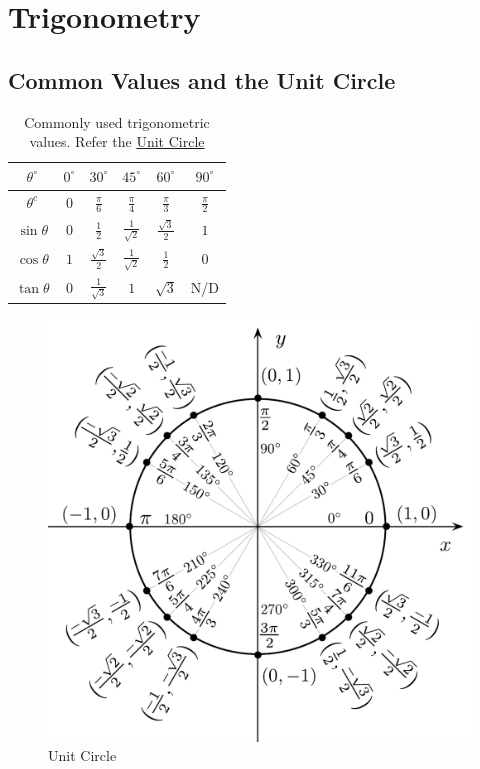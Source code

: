 \section{Trigonometry}
\subsection{Common Values and the Unit Circle}
\begin{table}[H]
	\centering
	\renewcommand{\arraystretch}{1.5}
	\begin{tabular}{cccccc}
		\toprule
		$\theta ^ \circ$ & $0^ \circ$ & $30^ \circ$ & $45^ \circ$ & $60^ \circ$ & $90^ \circ$ \\ \midrule
		$\theta ^ c$ & $0$ & $\frac{\pi}{6}$ & $\frac{\pi}{4}$ & $\frac{\pi}{3}$ & $\frac{\pi}{2}$ \\ \midrule
		$\sin \theta$ & $0$ & $\frac{1}{2}$ & $\frac{1}{\sqrt{2}}$ & $\frac{\sqrt{3}}{2}$ & $1$ \\
		$\cos \theta$ & $1$ & $\frac{\sqrt{3}}{2}$ & $\frac{1}{\sqrt{2}}$ & $\frac{1}{2}$ & $0$ \\
		$\tan \theta$ & 0 & $\frac{1}{\sqrt{3}}$ & $1$ & $\sqrt{3}$ & N/D \\ \bottomrule
	\end{tabular}
	\caption{\label{standardvals}Commonly used trigonometric values. Refer the \hyperref[unitcircle]{Unit Circle}}
\end{table}
\begin{figure}[ht]
	\centering
	\includegraphics[scale=0.8]{figures/Unit_circle_angles.pdf}
	\caption{\label{unitcircle} Unit Circle}
\end{figure}

